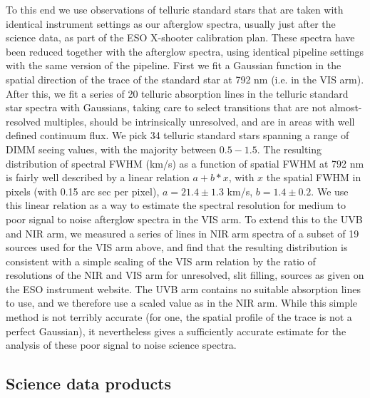 \documentclass{aa}    %
\begin{document}
To this end we use observations of telluric standard stars that are taken with
identical instrument settings as our afterglow spectra, usually just after the
science data, as part of the ESO X-shooter calibration plan. These spectra have
been reduced together with the afterglow spectra, using identical pipeline
settings with the same version of the pipeline. First we fit a Gaussian function
in the spatial direction of the trace of the standard star at 792 nm (i.e. in
the VIS arm). After this, we fit a series of  20 telluric absorption lines in
the telluric standard star spectra with Gaussians, taking care to select
transitions that are not almost-resolved multiples, should be intrinsically
unresolved, and are in areas with well defined continuum flux. We pick 34
telluric standard stars spanning a range of DIMM seeing values, with the
majority between $0.5-1.5 $\arcsec. The resulting distribution of spectral FWHM
(km/s) as a function of spatial FWHM at 792 nm is fairly well described by a
linear relation $a + b*x$, with $x$ the spatial FWHM in pixels (with 0.15 arc
sec per pixel),  $a= 21.4 \pm 1.3$ km/s, $b=1.4 \pm 0.2$. We use this linear
relation as a way to estimate the spectral resolution for medium to poor signal
to noise afterglow spectra in the VIS arm. To extend this to the UVB and NIR
arm, we measured a series of lines in NIR arm spectra of a subset of 19 sources
used for the VIS arm above, and find that the resulting distribution is
consistent with a simple scaling of the VIS arm relation by the ratio of
resolutions of the NIR and VIS arm for unresolved, slit filling, sources as
given on the ESO instrument website. The UVB arm contains no suitable absorption
lines to use, and we therefore use a scaled value as in the NIR arm. While this
simple method is not terribly accurate (for one, the spatial profile of the
trace is not a perfect Gaussian), it nevertheless gives a sufficiently accurate
estimate for the analysis of these poor signal to noise science spectra.


\subsection{Science data products} \label{products}

\end{document}
